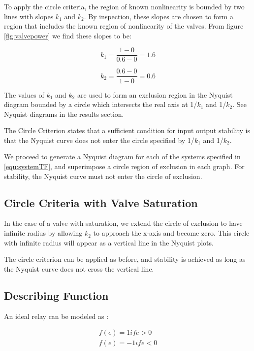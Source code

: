 \documentclass[a4paper, titlepage]{article}
\begin{document}
To apply the circle criteria, the region of known nonlinearity is bounded by two lines with slopes $k_{1}$ and $k_{2}$.  By inspection, these slopes are chosen to form a region that includes the known region of nonlinearity of the valves.  From figure \ref{fig:valvepower} we find these slopes to be:

\begin{equation}
k_{1} = \frac{1-0}{0.6-0} = 1.6
\label{equ:k1_value}
\end{equation}

\begin{equation}
k_{2} = \frac{0.6-0}{1-0} = 0.6
\label{equ:k2_value}
\end{equation}

The values of $k_{1}$ and $k_{2}$ are used to form an exclusion region in the Nyquist diagram bounded by a circle which intersects the real axis at 1/$k_{1}$ and 1/$k_{2}$.  See Nyquist diagrams in the results section.

The Circle Criterion \citep[p. 334]{glad00} states that a sufficient condition for input output stability is that the Nyquist curve does not enter the circle specified by 1/$k_{1}$ and 1/$k_{2}$.

We proceed to generate a Nyquist diagram for each of the systems specified in \ref{equ:systemTF}, and superimpose a circle region of exclusion in each graph.
For stability, the Nyquist curve must not enter the circle of exclusion.

\subsection{Circle Criteria with Valve Saturation}

In the case of a valve with saturation, we extend the circle of exclusion to have infinite radius by allowing $k_{2}$ to approach the x-axis and become zero.  This circle with infinite radius will appear as a vertical line in the Nyquist plots.

The circle criterion can be applied as before, and stability is achieved as long as the Nyquist curve does not cross the vertical line.

\subsection{Describing Function}

An ideal relay can be modeled as \citep[p. 358]{glad00}:

\begin{equation}
\begin{split}
f(e) = 1 if e > 0 \\
f(e) = -1 if e <0
\end{split}
\label{equ:relay}
\end{equation}
\end{document}
